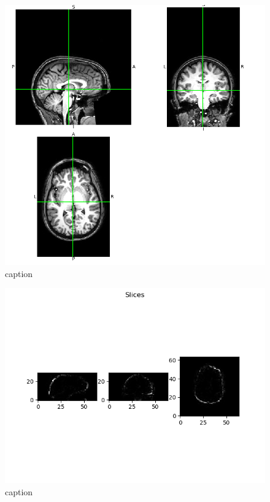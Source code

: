 \documentclass[10pt,twocolumn,letterpaper]{article}
\begin{document}
 \begin{figure}
  \includegraphics[width=\linewidth]{images/orthoview_t1w.png}
  \caption{caption}
  \label{fig:ortho-t1w}
\end{figure}

 \begin{figure}
  \includegraphics[width=\linewidth]{images/var_on_cortex_2.png}
  \caption{caption}
  \label{fig:cortex-var}
\end{figure}
\end{document}
